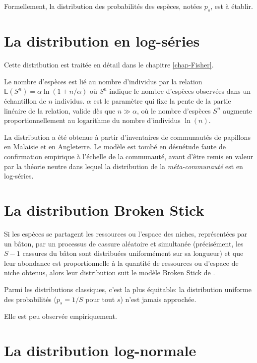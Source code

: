 \documentclass[
  11pt,
  american,
  a4paper,
  extrafontsizes,onecolumn,openright
  ]{memoir}
\begin{document}
Formellement, la distribution des probabilités des espèces, notées \(p_s\), est à établir.

\section{La distribution en log-séries}\label{la-distribution-en-log-suxe9ries}

Cette distribution est traitée en détail dans le chapitre \ref{chap-Fisher}.

Le nombre d'espèces est lié au nombre d'individus par la relation \({\mathbb E}(S^n) = \alpha \ln(1 + n / \alpha)\) où \(S^n\) indique le nombre d'espèces observées dans un échantillon de \(n\) individus.
\(\alpha\) est le paramètre qui fixe la pente de la partie linéaire de la relation, valide dès que \(n \gg \alpha\), où le nombre d'espèces \(S^n\) augmente proportionnellement au logarithme du nombre d'individus \(\ln(n)\).

La distribution a été obtenue à partir d'inventaires de communautés de papillons en Malaisie et en Angleterre.
Le modèle est tombé en désuétude faute de confirmation empirique à l'échelle de la communauté, avant d'être remis en valeur par la théorie neutre \autocite{Hubbell2001} dans lequel la distribution de la \emph{méta-communauté} est en log-séries.

\section{La distribution Broken Stick}\label{la-distribution-broken-stick}

Si les espèces se partagent les ressources ou l'espace des niches, représentées par un bâton, par un processus de cassure aléatoire et simultanée (précisément, les \(S-1\) cassures du bâton sont distribuées uniformément sur sa longueur) et que leur abondance est proportionnelle à la quantité de ressources ou d'espace de niche obtenus, alors leur distribution suit le modèle Broken Stick de \textcite{MacArthur1957}.

Parmi les distributions classiques, c'est la plus équitable: la distribution uniforme des probabilités (\(p_s = 1 / S\) pour tout \(s\)) n'est jamais approchée.

Elle est peu observée empiriquement.

\section{La distribution log-normale}\label{la-distribution-log-normale}
\end{document}
